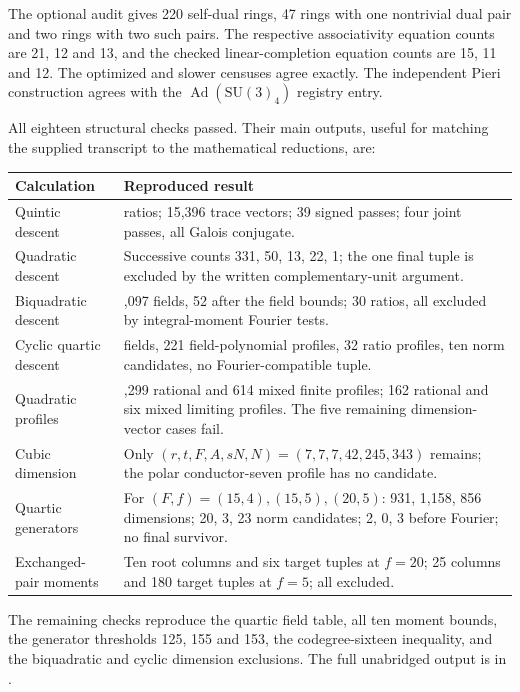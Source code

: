 \documentclass[11pt,a4paper]{article}
\begin{document}
The optional audit gives 220 self-dual rings, 47 rings with one
nontrivial dual pair and two rings with two such pairs. The respective
associativity equation counts are 21, 12 and 13, and the checked
linear-completion equation counts are 15, 11 and 12. The optimized and
slower censuses agree exactly. The independent Pieri construction
agrees with the $\operatorname{Ad}(\mathrm{SU}(3)_4)$ registry entry.

All eighteen structural checks passed. Their main outputs, useful for
matching the supplied transcript to the mathematical reductions, are:
\begin{center}\small
\begin{tabularx}{\textwidth}{@{}>{\raggedright\arraybackslash}p{}>{\raggedright\arraybackslash}X@{}}
\toprule
Calculation & Reproduced result\\\midrule
Quintic descent & 34 ratios; 15,396 trace vectors; 39 signed passes;
four joint passes, all Galois conjugate.\\
Quadratic descent & Successive counts 331, 50, 13, 22, 1; the one final
tuple is excluded by the written complementary-unit argument.\\
Biquadratic descent & 2,097 fields, 52 after the field bounds;
30 ratios, all excluded by integral-moment Fourier tests.\\
Cyclic quartic descent & 105 fields, 221 field-polynomial profiles,
32 ratio profiles, ten norm candidates, no Fourier-compatible tuple.\\
Quadratic profiles & 1,299 rational and 614 mixed finite profiles;
162 rational and six mixed limiting profiles. The five remaining
dimension-vector cases fail.\\
Cubic dimension & Only $(r,t,F,A,sN,N)=(7,7,7,42,245,343)$ remains;
the polar conductor-seven profile has no candidate.\\
Quartic generators & For $(F,f)=(15,4),(15,5),(20,5)$:
931, 1,158, 856 dimensions; 20, 3, 23 norm candidates;
2, 0, 3 before Fourier; no final survivor.\\
Exchanged-pair moments & Ten root columns and six target tuples at
$f=20$; 25 columns and 180 target tuples at $f=5$; all excluded.\\\bottomrule
\end{tabularx}
\end{center}
The remaining checks reproduce the quartic field table, all ten moment
bounds, the generator thresholds 125, 155 and 153, the codegree-sixteen
inequality, and the biquadratic and cyclic dimension exclusions. The
full unabridged output is in .
\end{document}
